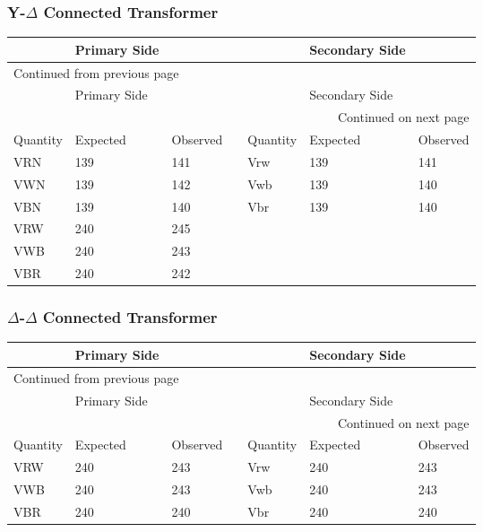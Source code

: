 \documentclass[11pt]{article}
\begin{document}
\subsubsection{Y-\(\Delta\) Connected Transformer}
\label{sec:org877e039}
\begin{longtable}{|l|l|l|l|l|l|l|}
\hline
 & Primary Side &  &  &  & Secondary Side & \\
\hline
\endfirsthead
\multicolumn{7}{l}{Continued from previous page} \\
\hline

 & Primary Side &  &  &  & Secondary Side &  \\

\hline
\endhead
\hline\multicolumn{7}{r}{Continued on next page} \\
\endfoot
\endlastfoot
\hline
Quantity & Expected & Observed &  & Quantity & Expected & Observed\\
\hline
VRN & 139 & 141 &  & Vrw & 139 & 141\\
\hline
VWN & 139 & 142 &  & Vwb & 139 & 140\\
\hline
VBN & 139 & 140 &  & Vbr & 139 & 140\\
\hline
VRW & 240 & 245 &  &  &  & \\
\hline
VWB & 240 & 243 &  &  &  & \\
\hline
VBR & 240 & 242 &  &  &  & \\
\hline
\end{longtable}
\subsubsection{\(\Delta\)-\(\Delta\) Connected Transformer}
\label{sec:org72fb8fd}
\begin{longtable}{|l|l|l|l|l|l|l|}
\hline
 & Primary Side &  &  &  & Secondary Side & \\
\hline
\endfirsthead
\multicolumn{7}{l}{Continued from previous page} \\
\hline

 & Primary Side &  &  &  & Secondary Side &  \\

\hline
\endhead
\hline\multicolumn{7}{r}{Continued on next page} \\
\endfoot
\endlastfoot
\hline
Quantity & Expected & Observed &  & Quantity & Expected & Observed\\
\hline
VRW & 240 & 243 &  & Vrw & 240 & 243\\
\hline
VWB & 240 & 243 &  & Vwb & 240 & 243\\
\hline
VBR & 240 & 240 &  & Vbr & 240 & 240\\
\hline
\end{longtable}
\end{document}

